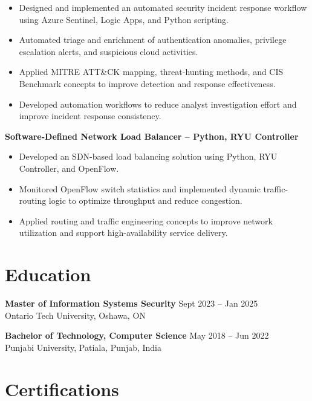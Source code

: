 \documentclass[11pt,a4paper]{article}
\begin{document}
\begin{itemize}[leftmargin=*]
\item Designed and implemented an automated security incident response workflow using Azure Sentinel, Logic Apps, and Python scripting.

\item Automated triage and enrichment of authentication anomalies, privilege escalation alerts, and suspicious cloud activities.

\item Applied MITRE ATT\&CK mapping, threat-hunting methods, and CIS Benchmark concepts to improve detection and response effectiveness.

\item Developed automation workflows to reduce analyst investigation effort and improve incident response consistency.
\end{itemize}

\textbf{Software-Defined Network Load Balancer -- Python, RYU Controller}

\begin{itemize}[leftmargin=*]
\item Developed an SDN-based load balancing solution using Python, RYU Controller, and OpenFlow.

\item Monitored OpenFlow switch statistics and implemented dynamic traffic-routing logic to optimize throughput and reduce congestion.

\item Applied routing and traffic engineering concepts to improve network utilization and support high-availability service delivery.
\end{itemize}

\section*{Education}

\textbf{Master of Information Systems Security} \hfill Sept 2023 -- Jan 2025\\
Ontario Tech University, Oshawa, ON

\textbf{Bachelor of Technology, Computer Science} \hfill May 2018 -- Jun 2022\\
Punjabi University, Patiala, Punjab, India

\section*{Certifications}
\end{document}

